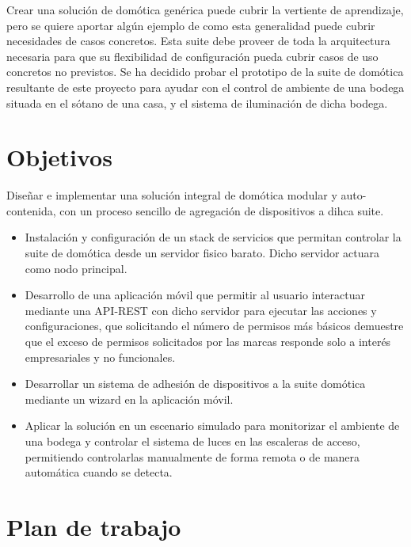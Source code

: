 \vspace{1cm}

Crear una solución de domótica genérica puede cubrir la vertiente de aprendizaje, pero se quiere aportar algún ejemplo de como esta generalidad puede cubrir necesidades de casos concretos. Esta suite debe proveer de toda la arquitectura necesaria para que su flexibilidad de configuración pueda cubrir casos de uso concretos no previstos. Se ha decidido probar el prototipo de la suite de domótica resultante de este proyecto para ayudar con el control de ambiente de una bodega situada en el sótano de una casa, y el sistema de iluminación de dicha bodega.

\section{Objetivos}
\label{ch:Capitulo1.1}

Diseñar e implementar una solución integral de domótica modular y auto-contenida, con un proceso sencillo de agregación de dispositivos a dihca suite.
\begin{itemize}
  \item Instalación y configuración de un stack de servicios que permitan controlar la suite de domótica desde un servidor fisico barato. Dicho servidor actuara como nodo principal.

  \item Desarrollo de una aplicación móvil que permitir al usuario interactuar mediante una API-REST con dicho servidor para ejecutar las acciones y configuraciones, que solicitando el número de permisos más básicos demuestre que el exceso de permisos solicitados por las marcas responde solo a interés empresariales y no funcionales.

  \item Desarrollar un sistema de adhesión de dispositivos a la suite domótica mediante un wizard en la aplicación móvil.
  
  \item Aplicar la solución en un escenario simulado para monitorizar el ambiente de una bodega y controlar el sistema de luces en las escaleras de acceso, permitiendo controlarlas manualmente de forma remota o de manera automática cuando se detecta.
\end{itemize}

\section{Plan de trabajo}
\label{ch:Capitulo1.2}

